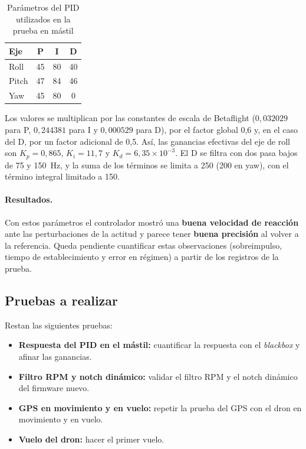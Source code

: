 \documentclass[12pt, letterpaper]{report}
\begin{document}
\begin{table}[htbp]
\centering
\caption{Parámetros del PID utilizados en la prueba en mástil}
\label{tab:pid_mastil}
\renewcommand{\arraystretch}{1.3}
\small
\begin{tabular}{@{}l c c c@{}}
\toprule
\rowcolor{gray!20}
\textbf{Eje} & \textbf{P} & \textbf{I} & \textbf{D} \\
\midrule
Roll & 45 & 80 & 40 \\
Pitch & 47 & 84 & 46 \\
Yaw & 45 & 80 & 0 \\
\bottomrule
\end{tabular}
\end{table}

Los valores se multiplican por las constantes de escala de Betaflight ($0{,}032029$ para P, $0{,}244381$ para I y $0{,}000529$ para D), por el factor global 0,6 y, en el caso del D, por un factor adicional de 0,5. Así, las ganancias efectivas del eje de roll son $K_p = 0{,}865$, $K_i = 11{,}7$ y $K_d = 6{,}35\times10^{-3}$. El D se filtra con dos pasa bajos de 75 y 150~Hz, y la suma de los términos se limita a 250 (200 en yaw), con el término integral limitado a 150.

\paragraph{Resultados.} Con estos parámetros el controlador mostró una \textbf{buena velocidad de reacción} ante las perturbaciones de la actitud y parece tener \textbf{buena precisión} al volver a la referencia. Queda pendiente cuantificar estas observaciones (sobreimpulso, tiempo de establecimiento y error en régimen) a partir de los registros de la prueba.

\subsection{Pruebas a realizar}
Restan las siguientes pruebas:

\begin{itemize}
    \item \textbf{Respuesta del PID en el mástil:} cuantificar la respuesta con el \textit{blackbox} y afinar las ganancias.

    \item \textbf{Filtro RPM y notch dinámico:} validar el filtro RPM y el notch dinámico del firmware nuevo.

    \item \textbf{GPS en movimiento y en vuelo:} repetir la prueba del GPS con el dron en movimiento y en vuelo.

    \item \textbf{Vuelo del dron:} hacer el primer vuelo.
\end{itemize}
\pagebreak
\end{document}
